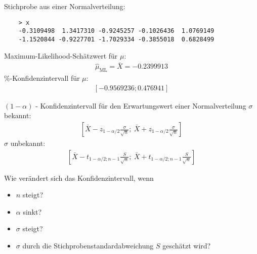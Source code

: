 \documentclass[t,11pt,aspectratio=169]{beamer}
\begin{document}
	
\begin{frame}[fragile]
	Stichprobe aus einer Normalverteilung:
	\begin{verbatim}
	> x
	-0.3109498  1.3417310 -0.9245257 -0.1026436  1.0769149 
	-1.1520844 -0.9227701 -1.7029334 -0.3855018  0.6828499
	\end{verbatim}
	\pause
	Maximum-Likelihood-Schätzwert für $\mu$:
	\begin{align*}
		\hat{\mu}_{\text{ML}} = \bar{X} = -0.2399913
	\end{align*}
	\%-Konfidenzintervall für $\mu$:
	\begin{align*}
		\left[ -0.9569236;  0.476941 \right]
	\end{align*}
\end{frame}

\begin{frame}
\begin{alertblock}{$(1-\alpha)$ - Konfidenzintervall für den Erwartungswert einer Normalverteilung}
	$\sigma$ bekannt:
	\begin{align*}
	\left[ \bar{X} - z_{1-\alpha/2} \frac{\sigma}{\sqrt{n}};~\bar{X} + z_{1-\alpha/2} \frac{\sigma}{\sqrt{n}}  \right]
	\end{align*}
	$\sigma$ unbekannt:
	\begin{align*}
	\left[ \bar{X} - t_{1-\alpha/2; n-1} \frac{S}{\sqrt{n}};~\bar{X} + t_{1-\alpha/2; n-1} \frac{S}{\sqrt{n}} \right]
	\end{align*}
\end{alertblock}
\pause Wie verändert sich das Konfidenzintervall, wenn
\begin{itemize}
	\item $n$ steigt?
	\item $\alpha$ sinkt?
	\item $\sigma$ steigt?
	\item $\sigma$ durch die Stichprobenstandardabweichung $S$ geschätzt wird?
\end{itemize}
\end{frame}
\end{document}

